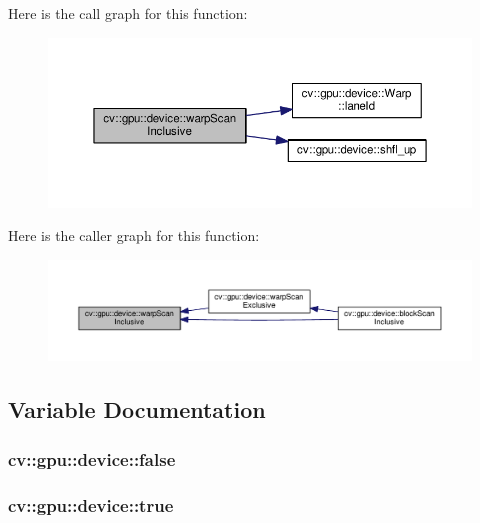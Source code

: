 Here is the call graph for this function\-:\nopagebreak
\begin{figure}[H]
\begin{center}
\leavevmode
\includegraphics[width=350pt]{namespacecv_1_1gpu_1_1device_a87edb73f5d347fb4deb04296ec7cff8d_cgraph}
\end{center}
\end{figure}




Here is the caller graph for this function\-:\nopagebreak
\begin{figure}[H]
\begin{center}
\leavevmode
\includegraphics[width=350pt]{namespacecv_1_1gpu_1_1device_a87edb73f5d347fb4deb04296ec7cff8d_icgraph}
\end{center}
\end{figure}




\subsection{Variable Documentation}
\hypertarget{namespacecv_1_1gpu_1_1device_af8d6418be1712e83b4f398e7e7273026}{
\subsubsection[{false}]{\setlength{\rightskip}{0pt plus 5cm}cv\-::gpu\-::device\-::false}}\label{namespacecv_1_1gpu_1_1device_af8d6418be1712e83b4f398e7e7273026}
\hypertarget{namespacecv_1_1gpu_1_1device_ac34c172a7a1904fb0fd477321a31f926}{
\subsubsection[{true}]{\setlength{\rightskip}{0pt plus 5cm}cv\-::gpu\-::device\-::true}}\label{namespacecv_1_1gpu_1_1device_ac34c172a7a1904fb0fd477321a31f926}
